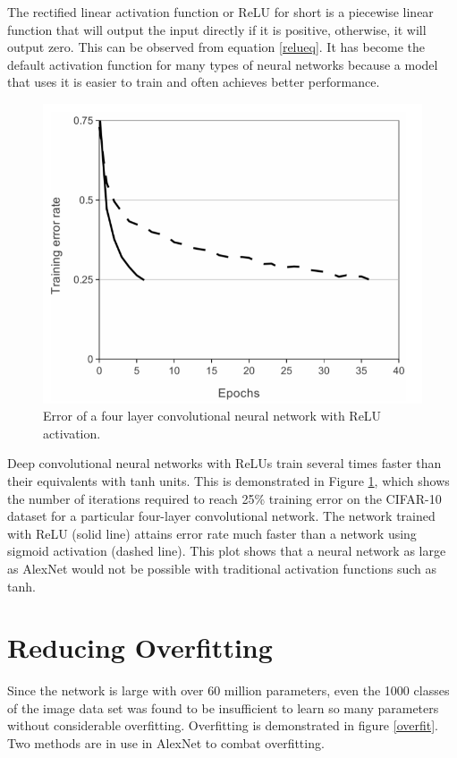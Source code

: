 \documentclass[11pt]{report}
\begin{document}
The rectified linear activation function or ReLU for short is a piecewise linear function that will output the input directly if it is positive, otherwise, it will output zero. This can be observed from equation \ref{relueq}.  
				It has become the default activation function for many types of neural networks because a model that uses it is easier to train and often achieves better performance.
\begin{figure}[!h]
	\includegraphics[scale=0.4]{relu.png}
	\centering 
	\caption{Error of a four layer convolutional neural network with ReLU activation.}
	\label{relu}
\end{figure}

Deep convolutional neural networks with ReLUs train several times faster than their equivalents with tanh units. This is demonstrated in Figure \ref{relu}, which shows the number of iterations required to reach 25\% training error on the CIFAR-10 dataset for a particular four-layer convolutional network. The network trained with ReLU (solid line) attains error rate much faster than a network using sigmoid activation (dashed line). This plot shows that a neural network as large as AlexNet would not be possible with traditional activation functions such as tanh.

\section{Reducing Overfitting}
Since the network is large with over 60 million parameters, even the 1000 classes of the image data set was found to be insufficient to learn so many parameters without considerable overfitting. Overfitting is demonstrated in figure \ref{overfit}. Two methods are in use in AlexNet to combat overfitting.
\end{document}
